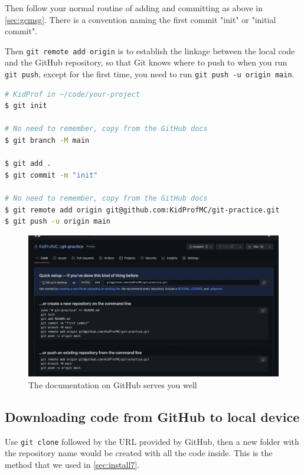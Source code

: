 Then follow your normal routine of adding and committing as above in \cref{sec:gcmsg}. There is a convention naming the first commit "init" or "initial commit".

Then \texttt{git remote add origin} is to establish the linkage between the local code and the GitHub repository, so that Git knows where to push to when you run \texttt{git push}, except for the first time, you need to run \texttt{git push -u origin main}.

\begin{lstlisting}[language=bash]
# KidProf in ~/code/your-project
$ git init

# No need to remember, copy from the GitHub docs
$ git branch -M main 

$ git add .
$ git commit -m "init"

# No need to remember, copy from the GitHub docs
$ git remote add origin git@github.com:KidProfMC/git-practice.git
$ git push -u origin main
\end{lstlisting}

\begin{figure}[h]
\centering
\includegraphics[width=15cm]{images/ch3-newrepocode.png}
\caption{The documentation on GitHub serves you well}
\end{figure}

\subsection{Downloading code from GitHub to local device}
\label{sec:gitclone}

Use \texttt{git clone} followed by the URL provided by GitHub, then a new folder with the repository name would be created with all the code inside. This is the method that we used in \cref{sec:install7}.

